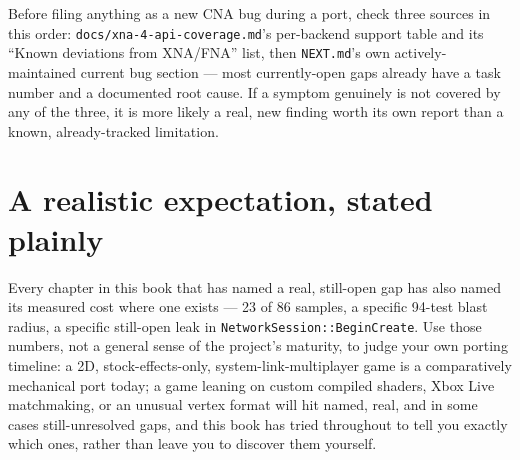 Before filing anything as a new CNA bug during a port, check three sources in this order:
\texttt{docs/xna-4-api-coverage.md}'s per-backend support table and its ``Known deviations
from XNA/FNA'' list, then \texttt{NEXT.md}'s own actively-maintained current bug section ---
most currently-open gaps already have a task number and a documented root cause. If a symptom
genuinely is not covered by any of the three, it is more likely a real, new finding worth its
own report than a known, already-tracked limitation.

\section{A realistic expectation, stated plainly}

Every chapter in this book that has named a real, still-open gap has also named its measured
cost where one exists --- 23 of 86 samples, a specific 94-test blast radius, a specific
still-open leak in \texttt{NetworkSession::BeginCreate}. Use those numbers, not a general
sense of the project's maturity, to judge your own porting timeline: a 2D, stock-effects-only,
system-link-multiplayer game is a comparatively mechanical port today; a game leaning on
custom compiled shaders, Xbox Live matchmaking, or an unusual vertex format will hit named,
real, and in some cases still-unresolved gaps, and this book has tried throughout to tell you
exactly which ones, rather than leave you to discover them yourself.
